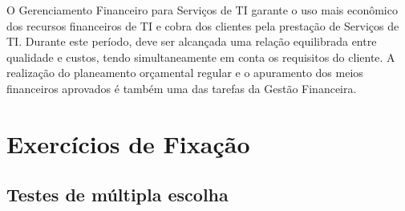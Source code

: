 \documentclass[
]{book}
\begin{document}
O Gerenciamento Financeiro para Serviços de TI garante o uso mais econômico dos recursos financeiros de TI e cobra dos clientes pela prestação de Serviços de TI. Durante este período, deve ser alcançada uma relação equilibrada entre qualidade e custos, tendo simultaneamente em conta os requisitos do cliente. A realização do planeamento orçamental regular e o apuramento dos meios financeiros aprovados é também uma das tarefas da Gestão Financeira.

\section{Exercícios de Fixação}\label{exercuxedcios-de-fixauxe7uxe3o}

\subsection{Testes de múltipla escolha}\label{testes-de-muxfaltipla-escolha}
\end{document}
